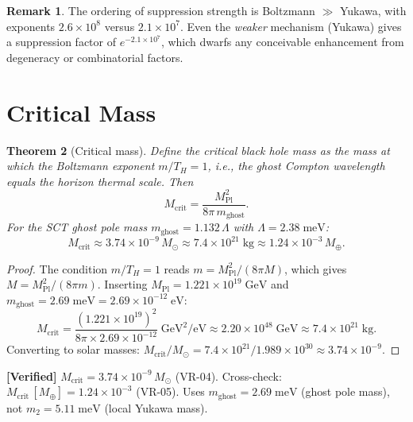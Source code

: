 \documentclass[11pt,a4paper]{article}
\newcommand{\MPl}{M_{\mathrm{Pl}}}
\newcommand{\Msun}{M_{\odot}}
\newcommand{\Mcrit}{M_{\mathrm{crit}}}
\newcommand{\mghost}{m_{\mathrm{ghost}}}
\newcommand{\Thr}{T_{\!\scriptscriptstyle H}}
\newcommand{\ie}{\textit{i.e.}}
\theoremstyle{plain}
\newtheorem{theorem}{Theorem}[section]
\theoremstyle{definition}
\newtheorem{remark}[theorem]{Remark}
\newcommand{\verified}[1]{%
  \par\smallskip\noindent
  \colorbox{green!10}{\parbox{\dimexpr\linewidth-2\fboxsep}{%
    \textcolor{green!50!black}{\textbf{[Verified]}} #1}}%
  \par\smallskip}
\begin{document}
\begin{remark}
  The ordering of suppression strength is
  Boltzmann $\gg$ Yukawa, with exponents
  $2.6\times 10^{8}$ versus $2.1\times 10^{7}$.
  Even the \emph{weaker} mechanism (Yukawa) gives a suppression
  factor of $e^{-2.1\times 10^{7}}$, which dwarfs any conceivable
  enhancement from degeneracy or combinatorial factors.
\end{remark}


\section{Critical Mass}\label{sec:critical_mass}

\begin{theorem}[Critical mass]\label{thm:critical}
  Define the critical black hole mass as the mass at which the
  Boltzmann exponent $m/\Thr = 1$, \ie, the ghost Compton wavelength
  equals the horizon thermal scale.  Then
  \begin{equation}\label{eq:Mcrit}
    \Mcrit
    = \frac{\MPl^2}{8\pi\,\mghost}.
  \end{equation}
  For the SCT ghost pole mass $\mghost = 1.132\,\Lambda$ with
  $\Lambda = 2.38\;\mathrm{meV}$:
  \begin{equation}\label{eq:Mcrit_numerical}
    \Mcrit \approx 3.74\times 10^{-9}\,\Msun
    \approx 7.4\times 10^{21}\;\mathrm{kg}
    \approx 1.24\times 10^{-3}\,M_\oplus.
  \end{equation}
\end{theorem}

\begin{proof}
  The condition $m/\Thr = 1$ reads $m = \MPl^2/(8\pi M)$, which
  gives $M = \MPl^2/(8\pi m)$.  Inserting
  $\MPl = 1.221\times 10^{19}\;\mathrm{GeV}$ and
  $\mghost = 2.69\;\mathrm{meV}
  = 2.69\times 10^{-12}\;\mathrm{eV}$:
  \[
    \Mcrit
    = \frac{(1.221\times 10^{19})^2}{8\pi\times 2.69\times 10^{-12}}
    \;\mathrm{GeV}^2/\mathrm{eV}
    \approx 2.20\times 10^{48}\;\mathrm{GeV}
    \approx 7.4\times 10^{21}\;\mathrm{kg}.
  \]
  Converting to solar masses:
  $\Mcrit/\Msun = 7.4\times 10^{21}/1.989\times 10^{30}
  \approx 3.74\times 10^{-9}$.
\end{proof}

\verified{$\Mcrit = 3.74 \times 10^{-9}\,\Msun$ (VR-04).
Cross-check: $\Mcrit\,[M_\oplus] = 1.24 \times 10^{-3}$ (VR-05).
Uses $\mghost = 2.69\;\mathrm{meV}$ (ghost pole mass), not
$m_2 = 5.11\;\mathrm{meV}$ (local Yukawa mass).}
\end{document}

